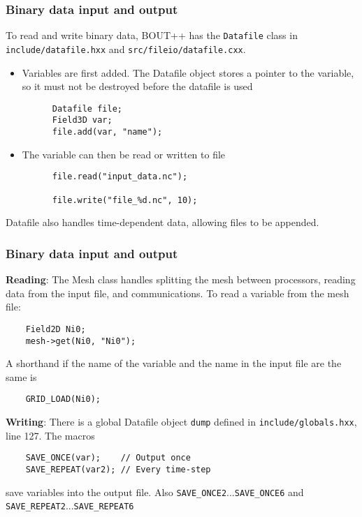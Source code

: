 \documentclass{beamer}
\begin{document}
\begin{frame}[fragile]
  \frametitle{Binary data input and output}
  
  To read and write binary data, BOUT++ has the \texttt{Datafile} class
  in \texttt{include/datafile.hxx} and \texttt{src/fileio/datafile.cxx}.

  \begin{itemize}
  \item Variables are first added. The Datafile object stores a pointer
    to the variable, so it must not be destroyed before the datafile is used
    \begin{verbatim}
      Datafile file;
      Field3D var;
      file.add(var, "name");
    \end{verbatim}
    \vspace{-0.5cm}
  \item The variable can then be read or written to file
    \begin{verbatim}
      file.read("input_data.nc");
      
      file.write("file_%d.nc", 10); 
    \end{verbatim}
    \vspace{-0.5cm}
  \end{itemize}
  
  Datafile also handles time-dependent data, allowing files to be appended.
\end{frame}

\begin{frame}[fragile]
  \frametitle{Binary data input and output}
  
  {\bf Reading}: The Mesh class handles splitting the mesh between
  processors, reading data from the input file, and communications.
  To read a variable from the mesh file:
  \begin{verbatim}
    Field2D Ni0;
    mesh->get(Ni0, "Ni0");
  \end{verbatim}
  \vspace{-0.5cm}
  A shorthand if the name of the variable and the name in the input
  file are the same is
  \begin{verbatim}
    GRID_LOAD(Ni0);
  \end{verbatim}
  \vspace{-0.5cm}
  
  {\bf Writing}: There is a global Datafile object \texttt{dump} defined in
  \texttt{include/globals.hxx}, line 127. The macros
  \begin{verbatim}
    SAVE_ONCE(var);    // Output once
    SAVE_REPEAT(var2); // Every time-step
  \end{verbatim}
  \vspace{-0.5cm}
  save variables into the output file. Also \texttt{SAVE\_ONCE2}...\texttt{SAVE\_ONCE6} and \texttt{SAVE\_REPEAT2}...\texttt{SAVE\_REPEAT6}
\end{frame}
\end{document}
